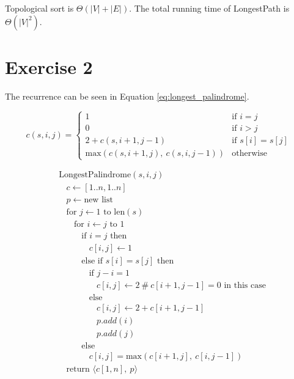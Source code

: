 \documentclass[koma,a4paper]{article}
\begin{document}
Topological sort is $\Theta(|V| + |E|)$. The total running time of LongestPath is $\Theta(|V|^2)$.

\pagebreak
\section{Exercise 2}
The recurrence can be seen in Equation \ref{eq:longest_palindrome}.

\begin{equation}
  c(s, i, j) = \begin{cases}
    1 &\text{if } i = j \\
    0 &\text{if } i > j \\
    2 + c(s, i + 1, j - 1) &\text{if } s[i] = s[j] \\
    \text{max}(c(s, i + 1, j),~c(s, i, j - 1)) &\text{otherwise}
  \end{cases}
  \label{eq:longest_palindrome}
\end{equation}

\begin{align*}
  &\text{LongestPalindrome}(s, i, j)\\
  &~~~~c \leftarrow [1..n, 1..n]\\
  &~~~~p \leftarrow \text{new list}\\
  &~~~~\text{for } j \leftarrow 1 \text{ to len}(s)\\
  &~~~~~~~~\text{for } i \leftarrow j \text{ to } 1\\
  &~~~~~~~~~~~~\text{if } i = j \text{ then}\\
  &~~~~~~~~~~~~~~~~c[i, j] \leftarrow 1\\
  &~~~~~~~~~~~~\text{else if } s[i] = s[j] \text{ then}\\
  &~~~~~~~~~~~~~~~~\text{if } j - i = 1\\
  &~~~~~~~~~~~~~~~~~~~~c[i, j] \leftarrow 2~\#~c[i + 1, j - 1] = 0 \text{ in this case}\\
  &~~~~~~~~~~~~~~~~\text{else}\\
  &~~~~~~~~~~~~~~~~~~~~c[i, j] \leftarrow 2 + c[i + 1, j - 1] \\
  &~~~~~~~~~~~~~~~~~~~~p.add(i)\\
  &~~~~~~~~~~~~~~~~~~~~p.add(j)\\
  &~~~~~~~~~~~~\text{else}\\
  &~~~~~~~~~~~~~~~~c[i, j] = \text{max}(c[i + 1, j],~c[i, j - 1])\\
  &~~~~\text{return } \langle c[1, n],~p \rangle
\end{align*}
\end{document}
